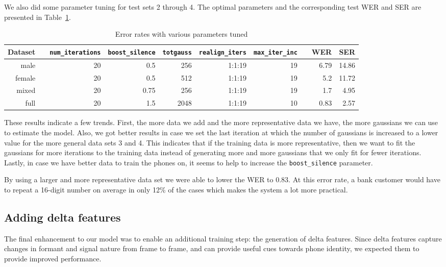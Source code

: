 \documentclass[twocolumn, 11pt]{article}
\begin{document}
We also did some parameter tuning for test sets 2 through 4. The optimal
parameters and the corresponding test WER and SER are presented in
Table~\ref{tab:wer-param}.

\begin{table}\centering
  \begin{tabular}{@{}rcrrrrrcrr@{}}\toprule%
    Dataset & \phantom{a} & \texttt{num\_iterations} & \texttt{boost\_silence}
    & \texttt{totgauss} & \texttt{realign\_iters} & \texttt{max\_iter\_inc}
    & \phantom{a} & WER & SER\\ \midrule%
    male && 20 & 0.5 & 256 & 1:1:19 & 19 && 6.79 & 14.86\\
    female && 20 & 0.5 & 512 & 1:1:19 & 19 && 5.2 & 11.72\\
    mixed && 20 & 0.75 & 256 & 1:1:19 & 19 && 1.7 & 4.95\\
    full && 20 & 1.5 & 2048 & 1:1:19 & 10 && 0.83 & 2.57\\
  \end{tabular}
  \caption{Error rates with various parameters tuned}\label{tab:wer-param}
\end{table}

These results indicate a few trends. First, the more data we add and the more
representative data we have, the more gaussians we can use to estimate the
model. Also, we got better results in case we set the last iteration at which
the number of gaussians is increased to a lower value for the more general data
sets 3 and 4. This indicates that if the training data is more representative,
then we want to fit the gaussians for more iterations to the training data
instead of generating more and more gaussians that we only fit for fewer
iterations. Lastly, in case we have better data to train the phones on, it seems
to help to increase the \texttt{boost\_silence} parameter.

By using a larger and  more representative data set we were able to lower the
WER to 0.83. At this error rate, a bank customer would have to repeat a 16-digit
number on average in only 12\% of the cases which makes the system a lot more
practical.

\subsection{Adding delta features}

The final enhancement to our model was to enable an additional training step:
the generation of delta features. Since delta features capture changes in
formant and signal nature from frame to frame, and can provide useful cues
towards phone identity, we expected them to provide improved performance.
\end{document}
